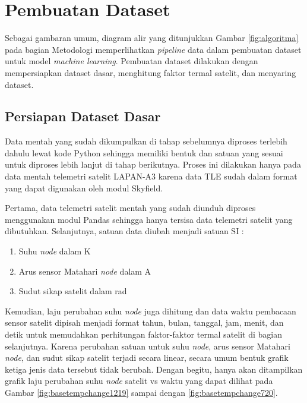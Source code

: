 \section{Pembuatan Dataset}

Sebagai gambaran umum, diagram alir yang ditunjukkan Gambar \ref{fig:algoritma}
pada bagian Metodologi memperlihatkan \textit{pipeline} data dalam pembuatan
dataset untuk model \textit{machine learning}. Pembuatan dataset dilakukan
dengan mempersiapkan dataset dasar, menghitung faktor termal satelit, dan
menyaring dataset.

\subsection{Persiapan Dataset Dasar}

Data mentah yang sudah dikumpulkan di tahap sebelumnya diproses terlebih dahulu
lewat kode Python sehingga memiliki bentuk dan satuan yang sesuai untuk
diproses lebih lanjut di tahap berikutnya. Proses ini dilakukan hanya pada data
mentah telemetri satelit LAPAN-A3 karena data TLE sudah dalam format yang dapat
digunakan oleh modul Skyfield. 

Pertama, data telemetri satelit mentah yang sudah diunduh diproses menggunakan modul Pandas sehingga hanya tersisa data telemetri satelit yang dibutuhkan. Selanjutnya, satuan data diubah menjadi satuan SI :

\begin{enumerate}
	\item Suhu \textit{node} dalam K
	\item Arus sensor Matahari \textit{node} dalam A
	\item Sudut sikap satelit dalam rad
\end{enumerate}

Kemudian, laju perubahan suhu \textit{node} juga dihitung dan data waktu
pembacaan sensor satelit dipisah menjadi format tahun, bulan, tanggal, jam,
menit, dan detik untuk memudahkan perhitungan faktor-faktor termal satelit di
bagian selanjutnya. Karena perubahan satuan untuk suhu \textit{node}, arus
sensor Matahari \textit{node}, dan sudut sikap satelit terjadi secara linear,
secara umum bentuk grafik ketiga jenis data tersebut tidak berubah. Dengan
begitu, hanya akan ditampilkan grafik laju perubahan suhu \textit{node} satelit
vs waktu yang dapat dilihat pada Gambar \ref{fig:basetempchange1219} sampai dengan
\ref{fig:basetempchange720}.


